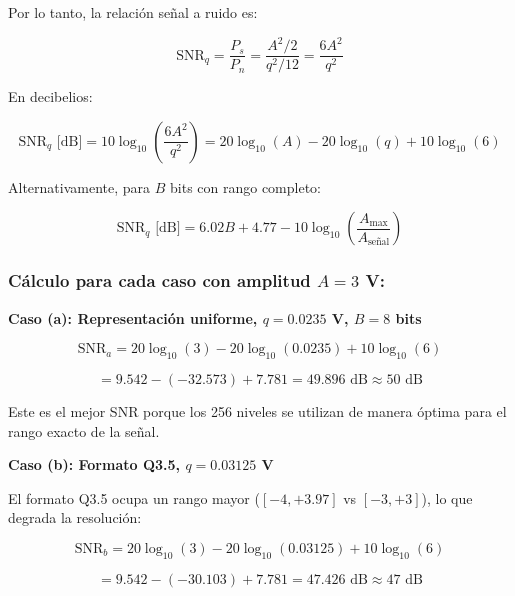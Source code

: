 \documentclass[12pt]{article}
\begin{document}
Por lo tanto, la relación señal a ruido es:
 
\begin{equation}
\text{SNR}_q = \frac{P_s}{P_n} = \frac{A^2/2}{q^2/12} = \frac{6A^2}{q^2}
\end{equation}
 
En decibelios:
 
\begin{equation}
\text{SNR}_q \text{ [dB]} = 10 \log_{10}\left(\frac{6A^2}{q^2}\right) = 20 \log_{10}(A) - 20 \log_{10}(q) + 10 \log_{10}(6)
\end{equation}
 
Alternativamente, para $B$ bits con rango completo:
 
\begin{equation}
\text{SNR}_q \text{ [dB]} = 6.02 B + 4.77 - 10 \log_{10}\left(\frac{A_{\text{max}}}{A_{\text{señal}}}\right)
\end{equation}
 
\subsubsection*{Cálculo para cada caso con amplitud $A = 3$ V:}
 
\textbf{Caso (a): Representación uniforme, $q = 0.0235$ V, $B = 8$ bits}
 
\begin{equation}
\text{SNR}_a = 20 \log_{10}(3) - 20 \log_{10}(0.0235) + 10 \log_{10}(6)
\end{equation}
 
\begin{equation}
= 9.542 - (-32.573) + 7.781 = 49.896 \text{ dB} \approx \boxed{50 \text{ dB}}
\end{equation}
 
Este es el mejor SNR porque los 256 niveles se utilizan de manera óptima para el rango exacto de la señal.
 
\textbf{Caso (b): Formato Q3.5, $q = 0.03125$ V}
 
El formato Q3.5 ocupa un rango mayor ($[-4, +3.97]$ vs $[-3, +3]$), lo que degrada la resolución:
 
\begin{equation}
\text{SNR}_b = 20 \log_{10}(3) - 20 \log_{10}(0.03125) + 10 \log_{10}(6)
\end{equation}
 
\begin{equation}
= 9.542 - (-30.103) + 7.781 = 47.426 \text{ dB} \approx \boxed{47 \text{ dB}}
\end{equation}
 
\end{document}
